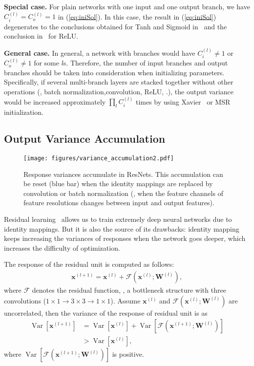 \documentclass[10pt,twocolumn,letterpaper]{article}
\newcommand{\smalltitle}[1]{\vspace{0.2em}\noindent \textbf{{#1}}}
\newcommand{\cF}{\mathcal{F}}
\newcommand{\W}{\mathbf{W}}
\newcommand{\bx}{\mathbf{x}}
\newcommand{\Var}{\operatorname{Var}}
\begin{document}
\smalltitle{Special case.} For plain networks with one input and one output branch, we have $C^{(l)}_i=C^{(l)}_o=1$ in (\ref{eq:iniSol}). In this case, the result in (\ref{eq:iniSol}) degenerates to the conclusions obtained for Tanh and Sigmoid in~\cite{glorot2010understanding}  and the conclusion in~\cite{he2015delving} for ReLU.

\smalltitle{General case.} In general, a network with branches would have $C^{(l)}_i\neq 1$ or $C^{(l)}_o\neq 1$ for some $l$s. Therefore, the number of input branches and output branches should be taken into consideration when initializing parameters. 
Specifically, if several multi-branch layers are stacked together without other operations (\eg, batch normalization,convolution, ReLU, \etc.), the output variance would be increased approximately $\prod_{l} C^{(l)}_i$ times by using Xavier~\cite{glorot2010understanding} or MSR~\cite{he2015delving} initialization. 



\subsection{Output Variance Accumulation}\label{sec:control_va}
\begin{figure}[t]
	\begin{center}
		\texttt{[image: figures/variance\_accumulation2.pdf]}
	\end{center}
	\caption{ Response variances accumulate in ResNets. This accumulation can be reset (blue bar) when the identity mappings are replaced by convolution or batch normalization (\ie, when the feature channels of feature resolutions changes between input and output features).}
	\label{fig:variance_accumulation}
	\vspace{-1.5em}
\end{figure}
Residual learning~\cite{he2016deep,he2016identity} allows us to train extremely deep neural networks due to  identity mappings. 
But it is also the source of its drawbacks: identity mapping keeps increasing the variances of responses when the network goes deeper, which increases the difficulty of optimization. 

The response of the residual unit is computed as follows:
{\small
\begin{align}
\bx^{(l+1)} = \bx^{(l)} + \cF\left(\bx^{(l)}; \W^{(l)}\right),
\end{align}
}
\!\!where $\cF$ denotes the residual function, \eg, a bottleneck structure with three convolutions ($1\times1\rightarrow 3\times 3 \rightarrow 1\times 1$). 
Assume $\bx^{(l)}$ and $\cF\left(\bx^{(l)}; \W^{(l)}\right)$ are uncorrelated, then the variance of the response of residual unit is as
{\small
\begin{align}
\Var\left[\bx^{(l+1)}\right] &= \Var\left[\bx^{(l)}\right] + \Var\left[\cF\left(\bx^{(l+1)}; \W^{(l)}\right)\right] \nonumber \\
&> \Var\left[\bx^{(l)}\right],
\end{align}
}
\!\!where $\Var\left[\cF\left(\bx^{(l+1)}; \W^{(l)}\right)\right]$ is positive. 
\end{document}
